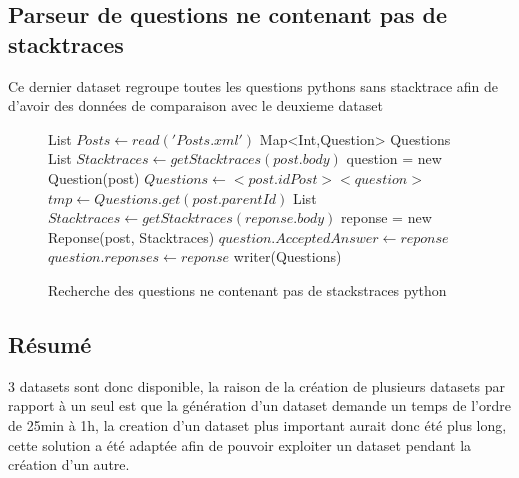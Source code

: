 \subsection{Parseur de questions ne contenant pas de stacktraces}
Ce dernier dataset regroupe toutes les questions pythons sans stacktrace afin de d'avoir des données de comparaison avec le deuxieme dataset
\begin{figure}[!h]
\begin{center}
\begin{algorithmic}
	\State List $Posts \gets read('Posts.xml')$
	\State Map<Int,Question> Questions
			\State List $Stacktraces \gets getStacktraces(post.body)$
				\State question = new Question(post)
				\State $Questions \gets <post.idPost><question>$
			\EndIf
		\Else {}
			\State $tmp\gets Questions.get(post.parentId)$
				\State List $Stacktraces \gets getStacktraces(reponse.body)$
				\State reponse = new Reponse(post, Stacktraces)
					\State $question.AcceptedAnswer \gets reponse$
				\Else
					\State $question.reponses \gets reponse$
				\EndIf
			\EndIf
		\EndIf
		\EndIf
	\EndFor
	\State writer(Questions)
\EndFunction
\end{algorithmic}
\caption{Recherche des questions ne contenant pas de stackstraces python}
\label{Recherche des questions ne contenant pas de stackstraces python}
\end{center}
\end{figure}
\subsection{Résumé}
3 datasets sont donc disponible, la raison de la création de plusieurs datasets par rapport à un seul est que la génération d'un dataset demande un temps de l'ordre de 25min à 1h, la creation d'un dataset plus important aurait donc été plus long, cette solution a été adaptée afin de pouvoir exploiter un dataset pendant la création d'un autre.